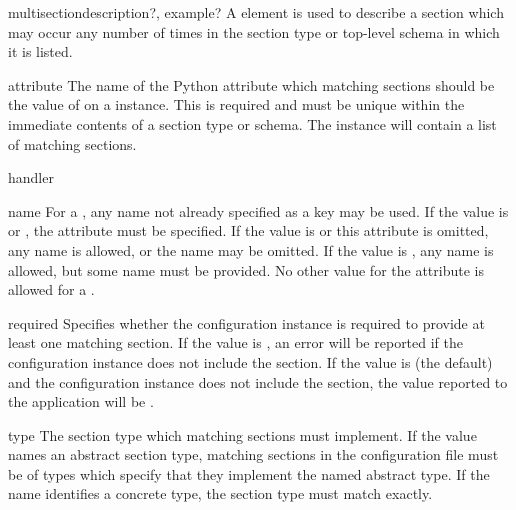 \documentclass{howto}
\newcommand{\datatype}[1]{\strong{#1}}
\begin{document}
\begin{elementdesc}{multisection}{description?, example?}
  A  element is used to describe a section which
  may occur any number of times in the section type or top-level
  schema in which it is listed.

  \begin{attributedesc}{attribute}{\datatype{identifier}}
    The name of the Python attribute which matching sections should be
    the value of on a  instance.  This is required
    and must be unique within the immediate contents of a section type
    or schema.  The  instance will contain a list
    of matching sections.
  \end{attributedesc}

  \begin{attributedesc}{handler}{\datatype{basic-key}}
  \end{attributedesc}

  \begin{attributedesc}{name}{\datatype{basic-key}}
    For a , any name not already specified as a
    key may be used.  If the value is \code{*} or \code{+}, the
     attribute must be specified.  If the value
    is \code{*} or this attribute is omitted, any name is allowed, or
    the name may be omitted.  If the value is \code{+}, any name is
    allowed, but some name must be provided.  No other value for the
     attribute is allowed for a
    .
  \end{attributedesc}

  \begin{attributedesc}{required}{}
    Specifies whether the configuration instance is required to
    provide at least one matching section.  If the value is
    , an error will be reported if the configuration
    instance does not include the section.  If the value is 
    (the default) and the configuration instance does not include the
    section, the value reported to the application will be
    .
  \end{attributedesc}

  \begin{attributedesc}{type}{\datatype{basic-key}}
    The section type which matching sections must implement.  If the
    value names an abstract section type, matching sections in the
    configuration file must be of types which specify that they
    implement the named abstract type.  If the name identifies a
    concrete type, the section type must match exactly.
  \end{attributedesc}
\end{elementdesc}
\end{document}
